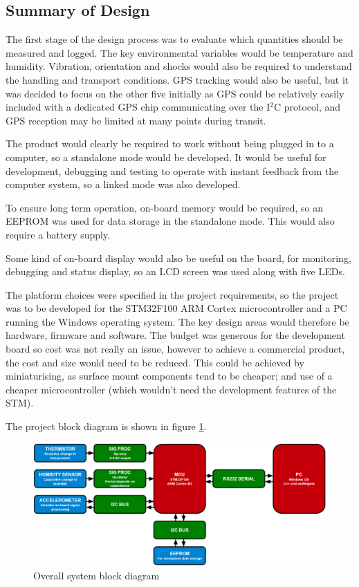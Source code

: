 \documentclass[a4paper,10pt]{article}  %
\begin{document}
\subsection{Summary of Design}
\label{sec:summary-design}

The first stage of the design process was to evaluate which quantities
should be measured and logged. The key environmental variables would
be temperature and humidity. Vibration, orientation and shocks would
also be required to understand the handling and transport
conditions. GPS tracking would also be useful, but it was decided to
focus on the other five initially as GPS could be relatively easily
included with a dedicated GPS chip communicating over the I$^2$C
protocol, and GPS reception may be limited at many points during
transit.

The product would clearly be required to work without being plugged in
to a computer, so a standalone mode would be developed. It would be
useful for development, debugging and testing to operate with instant
feedback from the computer system, so a linked mode was also
developed.

To ensure long term operation, on-board memory would be required, so an
EEPROM was used for data storage in the standalone mode. This would
also require a battery supply.

Some kind of on-board display would also be useful on the board, for
monitoring, debugging and status display, so an LCD screen was used
along with five LEDs.

The platform choices were specified in the project requirements, so
the project was to be developed for the STM32F100 ARM Cortex
microcontroller and a PC running the Windows operating system. The key
design areas would therefore be hardware, firmware and software. The
budget was generous for the development board so cost was not really
an issue, however to achieve a commercial product, the cost and size
would need to be reduced. This could be achieved by miniaturising, as
surface mount components tend to be cheaper; and use of a cheaper
microcontroller (which wouldn't need the development features of the
STM).

The project block diagram is shown in figure \ref{fig:sysblkdgrm}.
\begin{figure}[htb]
  \begin{center}
    \includegraphics[width=1.0\textwidth]{System_diagram.png}
  \end{center}
  \caption{Overall system block diagram}
  \label{fig:sysblkdgrm}
\end{figure}
\end{document}
